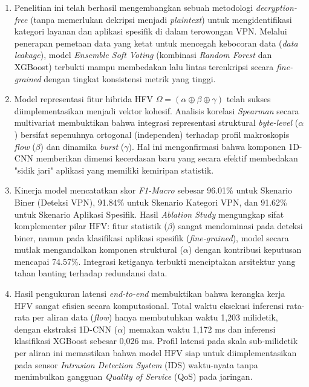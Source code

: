 \begin{enumerate}
    \item Penelitian ini telah berhasil mengembangkan sebuah metodologi \textit{decryption-free} (tanpa memerlukan dekripsi menjadi \textit{plaintext}) untuk mengidentifikasi kategori layanan dan aplikasi spesifik di dalam terowongan VPN. Melalui penerapan pemetaan data yang ketat untuk mencegah kebocoran data (\textit{data leakage}), model \textit{Ensemble Soft Voting} (kombinasi \textit{Random Forest} dan XGBoost) terbukti mampu membedakan lalu lintas terenkripsi secara \textit{fine-grained} dengan tingkat konsistensi metrik yang tinggi.

    \item Model representasi fitur hibrida HFV $\Omega = (\alpha \oplus \beta \oplus \gamma)$ telah sukses diimplementasikan menjadi vektor kohesif. Analisis korelasi \textit{Spearman} secara multivariat membuktikan bahwa integrasi representasi struktural \textit{byte-level} ($\alpha$) bersifat sepenuhnya ortogonal (independen) terhadap profil makroskopis \textit{flow} ($\beta$) dan dinamika \textit{burst} ($\gamma$). Hal ini mengonfirmasi bahwa komponen 1D-CNN memberikan dimensi kecerdasan baru yang secara efektif membedakan "sidik jari" aplikasi yang memiliki kemiripan statistik.

    \item Kinerja model mencatatkan skor \textit{F1-Macro} sebesar 96.01\% untuk Skenario Biner (Deteksi VPN), 91.84\% untuk Skenario Kategori VPN, dan 91.62\% untuk Skenario Aplikasi Spesifik. Hasil \textit{Ablation Study} mengungkap sifat komplementer pilar HFV: fitur statistik ($\beta$) sangat mendominasi pada deteksi biner, namun pada klasifikasi aplikasi spesifik (\textit{fine-grained}), model secara mutlak mengandalkan komponen struktural ($\alpha$) dengan kontribusi keputusan mencapai 74.57\%. Integrasi ketiganya terbukti menciptakan arsitektur yang tahan banting terhadap redundansi data.

    \item Hasil pengukuran latensi \textit{end-to-end} membuktikan bahwa kerangka kerja HFV sangat efisien secara komputasional. Total waktu eksekusi inferensi rata-rata per aliran data (\textit{flow}) hanya membutuhkan waktu 1,203 milidetik, dengan ekstraksi 1D-CNN ($\alpha$) memakan waktu 1,172 ms dan inferensi klasifikasi XGBoost sebesar 0,026 ms. Profil latensi pada skala sub-milidetik per aliran ini memastikan bahwa model HFV siap untuk diimplementasikan pada sensor \textit{Intrusion Detection System} (IDS) waktu-nyata tanpa menimbulkan gangguan \textit{Quality of Service} (QoS) pada jaringan.
\end{enumerate}

